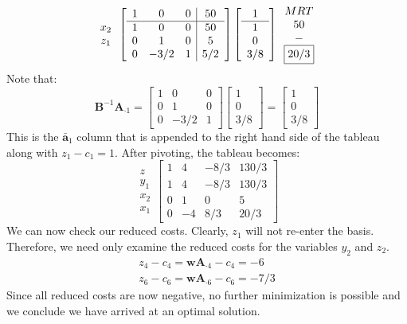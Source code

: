 \begin{example}
\begin{equation}
\begin{array}{c}
x_2\\
z_1
\end{array}
\left[
\begin{array}{ccc|c}
1	&	0	&	0	&	50\\
\hline
1	&	0	&	0	&	50\\
0	&	1	&	0	&	5\\
0	&	-3/2	&	1	&	5/2
\end{array}
\right]
\left[
\begin{array}{c}
1\\
\hline
1\\
0\\
3/8
\end{array}
\right]
\begin{array}{c}
MRT\\
50\\
-\\
\fbox{20/3}
\end{array}
\end{equation}
Note that:
\begin{displaymath}
\mathbf{B}^{-1}\mathbf{A}_{\cdot 1} = 
\begin{bmatrix}
1 & 0 & 0\\
0 & 1 & 0\\
0 & -3/2 & 1
\end{bmatrix}
\begin{bmatrix}
1\\0\\3/8
\end{bmatrix} = 
\begin{bmatrix}
1\\0\\3/8
\end{bmatrix}
\end{displaymath}
This is the $\bar{\mathbf{a}}_1$ column that is appended to the right hand side of the tableau along with $z_1 - c_1 = 1$. After pivoting, the tableau becomes:
\begin{equation}
\begin{array}{c}
z\\
y_1\\
x_2\\
x_1
\end{array}
\left[
\begin{array}{ccc|c}
1	&	4	&	-8/3	&	130/3\\
\hline
1	&	4	&	-8/3	&	130/3\\
0	&	1	&	0	&	5\\
0	&	-4	&	8/3	&	20/3
\end{array}
\right]
\end{equation}
We can now check our reduced costs. Clearly, $z_1$ will not re-enter the basis. Therefore, we need only examine the reduced costs for the variables $y_2$ and $z_2$.
\begin{gather*}
z_4 - c_4 = \mathbf{w}\mathbf{A}_{\cdot 4} - c_4 = -6\\
z_6 - c_6 = \mathbf{w}\mathbf{A}_{\cdot 6} - c_6 = -7/3
\end{gather*}
Since all reduced costs are now negative, no further minimization is possible and we conclude we have arrived at an optimal solution.


\end{example}
